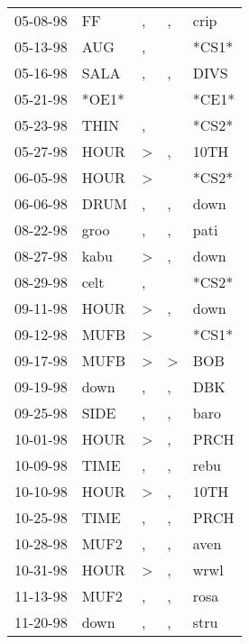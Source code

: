 \begin{supertabular}{lllll}
 05-08-98 &     FF &                , &                , &   crip \\
 05-13-98 &    AUG &                , &                  &  *CS1* \\
 05-16-98 &   SALA &                , &                , &   DIVS \\
 05-21-98 &  *OE1* &                  &                  &  *CE1* \\
 05-23-98 &   THIN &                , &                  &  *CS2* \\
 05-27-98 &   HOUR &     \textgreater &                , &   10TH \\
 06-05-98 &   HOUR &     \textgreater &                  &  *CS2* \\
 06-06-98 &   DRUM &                , &                , &   down \\
 08-22-98 &   groo &                , &                , &   pati \\
 08-27-98 &   kabu &     \textgreater &                , &   down \\
 08-29-98 &   celt &                , &                  &  *CS2* \\
 09-11-98 &   HOUR &     \textgreater &                , &   down \\
 09-12-98 &   MUFB &     \textgreater &                  &  *CS1* \\
 09-17-98 &   MUFB &     \textgreater &     \textgreater &    BOB \\
 09-19-98 &   down &                , &                , &    DBK \\
 09-25-98 &   SIDE &                , &                , &   baro \\
 10-01-98 &   HOUR &     \textgreater &                , &   PRCH \\
 10-09-98 &   TIME &                , &                , &   rebu \\
 10-10-98 &   HOUR &     \textgreater &                , &   10TH \\
 10-25-98 &   TIME &                , &                , &   PRCH \\
 10-28-98 &   MUF2 &                , &                , &   aven \\
 10-31-98 &   HOUR &     \textgreater &                , &   wrwl \\
 11-13-98 &   MUF2 &                , &                , &   rosa \\
 11-20-98 &   down &                , &                , &   stru \\

\end{supertabular}
